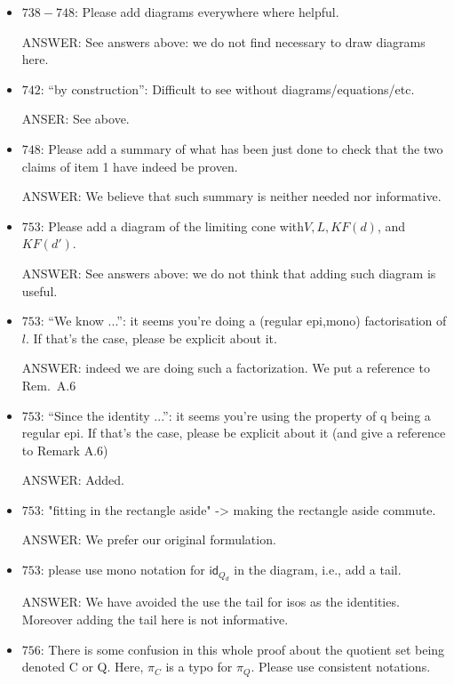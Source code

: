 \documentclass[english,11pt,a4paper]{article}
\begin{document}
\begin{itemize}
\item $738-748$: Please add diagrams everywhere where helpful.

ANSWER: See answers above: we do not find necessary to draw diagrams here. 

\item $742$: ``by construction'': Difficult to see without diagrams/equations/etc.

ANSER: See above.

\item $748$: Please add a summary of what has been just done to check that the two claims of item 1 have indeed be proven.

ANSWER: We believe that such summary is neither needed nor informative.

\item $753$: Please add a diagram of the limiting cone with$ V,L,KF(d)$, and $KF(d')$.

ANSWER:  See answers above: we do not think that adding such diagram is useful.

\item $753$: ``We know ...'': it seems you're doing a (regular epi,mono) factorisation of $l$. If that's the case, please be explicit about it.

ANSWER: indeed we are doing such a factorization. We put a reference to Rem.~A.6 

\item $753$: ``Since the identity ...'': it seems you're using the property of q being a regular epi. If that's the case, please be explicit about it (and give a reference to Remark A.6)

ANSWER: Added.

\item $753$: "fitting in the rectangle aside" -> making the rectangle aside commute.

ANSWER: We prefer our original formulation. 

\item $753$: please use mono notation for $\mathsf{id}_{Q_d}$ in the diagram, i.e., add a tail.

ANSWER: We have avoided the use the tail for isos as the identities. Moreover adding the tail here is not informative.

\item $756$: There is some confusion in this whole proof about the quotient set being denoted C or Q. Here, $\pi_C$ is a typo for $\pi_Q$. Please use consistent notations.


\end{itemize}
\end{document}
